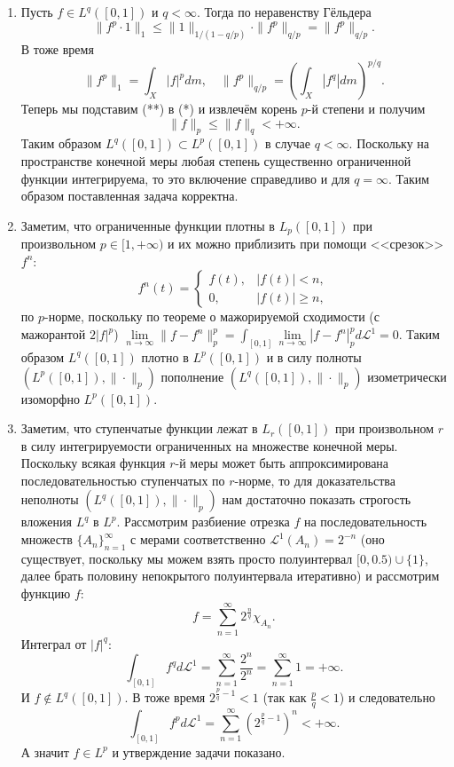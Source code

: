 \begin{solve}
    \begin{enumerate}
        \item Пусть $f \in L^q([0, 1])$ и $q < \infty$. Тогда по неравенству Гёльдера
        \[
            \|f^p \cdot 1\|_1 \leq \|1\|_{1/(1 - q/p)} \cdot \|f^p\|_{q/p} = \|f^p\|_{q/p}. \tag{*}
        \]
        В тоже время
        \[
            \|f^p\|_1 = \int_X |f|^p dm, \quad \|f^p\|_{q/p} = \left(\int_X |f^q|dm\right)^{p/q}. \tag{**}
        \]
        Теперь мы подставим (**) в (*) и извлечём корень $p$-й степени и получим
        \[
            \|f\|_p \leq \|f\|_q < +\infty.
        \]
        Таким образом $L^q([0, 1]) \subset L^p([0, 1])$ в случае $q < \infty$. Поскольку на пространстве конечной меры любая степень существенно ограниченной функции интегрируема, то это включение справедливо и для $q = \infty$. Таким образом поставленная задача корректна.
        \item Заметим, что ограниченные функции плотны в $L_p([0, 1])$ при произвольном $p \in [1, +\infty)$ и их можно приблизить при помощи <<срезок>> $f^n\colon$
        \[
            f^n(t) = \begin{cases}
                         f(t), & |f(t)| < n, \\
                         0, & |f(t)| \geq n,
            \end{cases}
        \]
        по $p$-норме, поскольку по теореме о мажорируемой сходимости (с мажорантой $2|f|^p$) $\lim\limits_{n \rightarrow \infty}\|f - f^n\|^p_p = \int_{[0, 1]} \lim\limits_{n \rightarrow \infty} |f - f^n|_p^p d\mathcal{L}^1 = 0$.
        Таким образом $L^q([0, 1])$ плотно в $L^p([0, 1])$ и в силу полноты $(L^p([0, 1]), \|\cdot\|_p)$ пополнение $(L^q([0, 1]), \|\cdot\|_p)$ изометрически изоморфно $L^p([0, 1])$.
        \item Заметим, что ступенчатые функции лежат в $L_r([0, 1])$ при произвольном $r$ в силу интегрируемости ограниченных на множестве конечной меры. Поскольку всякая функция $r$-й меры может быть аппроксимирована последовательностью ступенчатых по $r$-норме, то для доказательства неполноты $(L^q([0, 1]), \|\cdot\|_p)$ нам достаточно показать строгость вложения $L^q$ в $L^p$. Рассмотрим разбиение отрезка $f$ на последовательность множеств $\{A_n\}_{n = 1}^{\infty}$ с мерами соответственно $\mathcal{L}^1(A_n) = 2^{-n}$ (оно существует, поскольку мы можем взять просто полуинтервал $[0, 0.5) \cup \{1\}$, далее брать половину непокрытого полуинтервала итеративно) и рассмотрим функцию $f\colon$
        \[
            f = \sum\limits_{n = 1}^{\infty} 2^{\frac{n}{q}} \chi_{A_n}.
        \]
        Интеграл от $|f|^q\colon$
        \[
            \int_{[0, 1]} f^qd\mathcal{L}^1 = \sum\limits_{n = 1}^{\infty} \frac{2^n}{2^n} = \sum\limits_{n = 1}^{\infty}1 = +\infty.
        \]
        И $f \notin L^q([0, 1])$. В тоже время $2^{\frac{p}{q} - 1} < 1$ (так как $\frac{p}{q} < 1$) и следовательно
        \[
            \int_{[0, 1]} f^pd\mathcal{L}^1 = \sum\limits_{n = 1}^{\infty} \left(2^{\frac{p}{q} - 1}\right)^n < +\infty.
        \]
        А значит $f \in L^p$ и утверждение задачи показано.
    \end{enumerate}
\end{solve}
